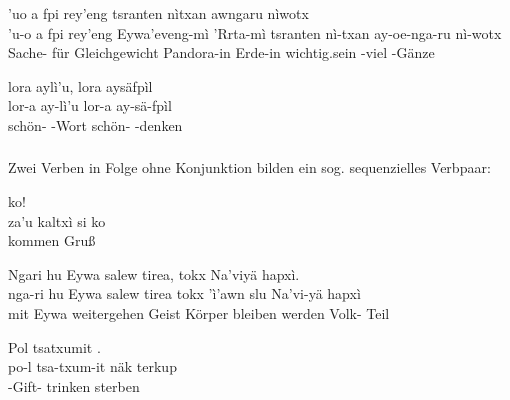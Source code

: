 \begin{interlin}
	\glll \Npawl{}'uo a fpi rey'eng   tsranten nìtxan awngaru nìwotx \\
	'u-o a fpi rey'eng Eywa'eveng-mì 'Rrta-mì tsranten nì-txan ay-oe-nga-ru nì-wotx \\
	Sache-  für Gleichgewicht Pandora-in Erde-in wichtig.sein -viel  -Gänze \\
\end{interlin}

\begin{interlin}
	\glll \Npawl{}lora aylì'u, lora aysäfpìl \\
	lor-a ay-lì'u lor-a ay-sä-fpìl \\
	schön- -Wort schön- -denken \\
\end{interlin}

\subsubsection{} 
Zwei Verben in Folge ohne Konjunktion bilden ein sog. sequenzielles Verbpaar:

\begin{interlin}
	\glll \Npawl{}   ko! \\
	za'u kaltxì si ko \\
	kommen Gruß   \\
\end{interlin}

\begin{interlin}
	\glll \Nfilm{}Ngari hu Eywa salew tirea, tokx   Na'viyä hapxì. \\
	nga-ri hu Eywa salew tirea tokx 'ì'awn slu Na'vi-yä hapxì \\
	 mit Eywa weitergehen Geist Körper bleiben werden Volk- Teil \\
\end{interlin}

\begin{interlin}
	\glll \Npawl{}Pol tsatxumit  . \\
	po-l tsa-txum-it näk terkup \\
	 -Gift- trinken sterben \\
\end{interlin}

